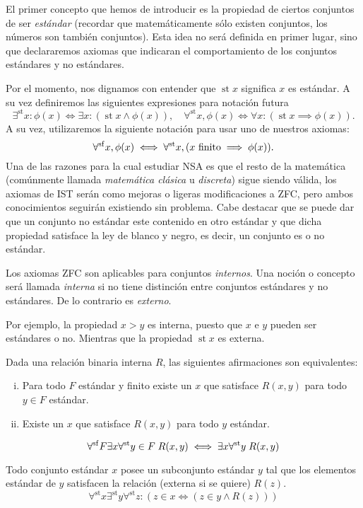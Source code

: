 \documentclass[11pt,oneside,a4paper]{book}
\DeclareMathOperator{\st}{st}
\newcommand{\existsst}{\exists^{\st}}
\newcommand{\forallst}{\forall^{\st}}
\newcommand{\forallsf}{\forall^{\rm sf}}
\begin{document}
El primer concepto que hemos de introducir es la propiedad de ciertos conjuntos de ser \textit{estándar} (recordar que matemáticamente sólo existen conjuntos, los números son también conjuntos). Esta idea no será definida en primer lugar, sino que declararemos axiomas que indicaran el comportamiento de los conjuntos estándares y no estándares.

Por el momento, nos dignamos con entender que $\st x$ significa $x$ es estándar. A su vez definiremos las siguientes expresiones para notación futura
$$\existsst x:\phi(x)\iff\exists x:(\st x\wedge\phi(x)),\quad\forallst x,\phi(x)\iff\forall x:(\st x\implies\phi(x)).$$
A su vez, utilizaremos la siguiente notación para usar uno de nuestros axiomas:
$$\forallsf x,\phi(x)\iff\forallst x,(x\text{ finito}\implies\phi(x)).$$
Una de las razones para la cual estudiar NSA es que el resto de la matemática (comúnmente llamada \textit{matemática clásica} u \textit{discreta}) sigue siendo válida, los axiomas de IST serán como mejoras o ligeras modificaciones a ZFC, pero ambos conocimientos seguirán existiendo sin problema. Cabe destacar que se puede dar que un conjunto no estándar este contenido en otro estándar y que dicha propiedad satisface la ley de blanco y negro, es decir, un conjunto es o no estándar.
\begin{mydef}
Los axiomas ZFC son aplicables para conjuntos \textit{internos}. Una noción o concepto será llamada \textit{interna} si no tiene distinción entre conjuntos estándares y no estándares. De lo contrario es \textit{externo}.
\end{mydef}
Por ejemplo, la propiedad $x\gt y$ es interna, puesto que $x$ e $y$ pueden ser estándares o no. Mientras que la propiedad $\st x$ es externa.
\begin{axiom}[de Idealización (I)]
Dada una relación binaria interna $R$, las siguientes afirmaciones son equivalentes:
\begin{enumerate}[i)]
\item Para todo $F$ estándar y finito existe un $x$ que satisface $R(x,y)$ para todo $y\in F$ estándar.
\item Existe un $x$ que satisface $R(x,y)$ para todo $y$ estándar.
\end{enumerate}
$$\forallsf F\exists x\forallst y\in F\;R(x,y)\iff\exists x\forallst y \;R(x,y)$$
\end{axiom}
\begin{axiom}[de Estandarización (S)]
Todo conjunto estándar $x$ posee un subconjunto estándar $y$ tal que los elementos estándar de $y$ satisfacen la relación (externa si se quiere) $R(z)$.
$$\forallst x\existsst y\forallst z:(z\in x\iff(z\in y\wedge R(z)))$$
\end{axiom}
\end{document}
